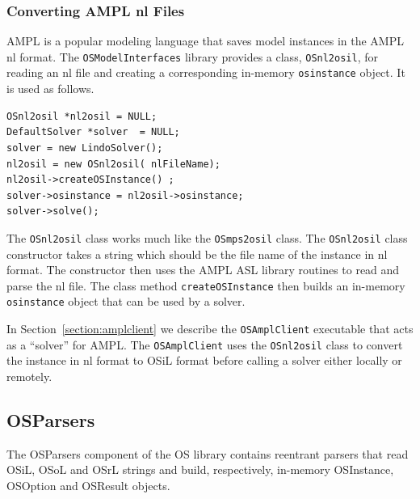\documentclass[11pt]{article}
\renewcommand{\_}{{\char"5F}}
\renewcommand{\{}{{\char"7B}}
\renewcommand{\}}{{\char"7D}}
\renewcommand{\^}{{\char"0D}}
\renewcommand{\'}{{\char"0D}}
\begin{document}
\begin{enumerate}[Step 1:]
\subsubsection{Converting AMPL nl Files}\label{section:nl2osil}

AMPL is a popular modeling language that saves  model instances in the AMPL nl format.
The {\tt OSModelInterfaces} library provides a class, {\tt OSnl2osil},
for reading an nl file and creating a
corresponding in-memory  {\tt osinstance} object. It is used as follows.

\begin{verbatim}
OSnl2osil *nl2osil = NULL;
DefaultSolver *solver  = NULL;
solver = new LindoSolver();
nl2osil = new OSnl2osil( nlFileName);
nl2osil->createOSInstance() ;
solver->osinstance = nl2osil->osinstance;
solver->solve();
\end{verbatim}


The {\tt OSnl2osil} class works much like the {\tt OSmps2osil} class. The
{\tt OSnl2osil} class constructor takes a string which should be the file name of the instance in nl format. The constructor then uses the AMPL ASL library routines to read and parse the nl file. The class method {\tt createOSInstance} then builds  an in-memory {\tt osinstance} object  that can be used by a solver.

In Section~\ref{section:amplclient}  we describe the {\tt OSAmplClient}
executable that acts as a ``solver'' for AMPL. The {\tt OSAmplClient} uses the {\tt OSnl2osil} class to convert
the instance in nl format to OSiL format before calling a solver either locally or remotely.


\subsection{OSParsers}\label{section:osparsers}

The OSParsers component of the OS library contains reentrant parsers that  read OSiL,
OSoL and OSrL strings and build, respectively, in-memory 
OSInstance, OSOption and 
OSResult  objects.



\end{enumerate}
\end{document}
